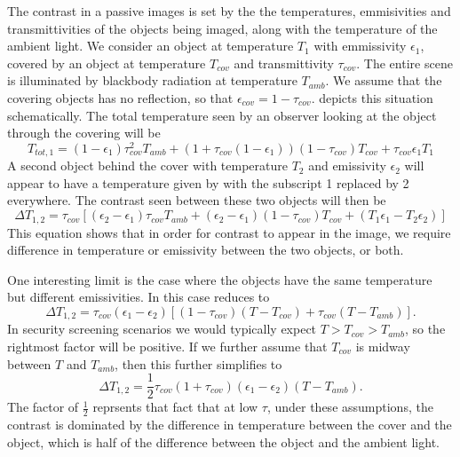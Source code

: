 The contrast in a passive images is set by the the temperatures, emmisivities and transmittivities of the objects being imaged, along with the temperature of the ambient light.
We consider an object at temperature $T_{1}$ with emmissivity $\epsilon_1$, covered by an object at temperature $T_{cov}$ and transmittivity $\tau_{cov}$.
The entire scene is illuminated by blackbody radiation at temperature $T_{amb}$.
We assume that the covering objects has no reflection, so that $\epsilon_{cov} = 1 - \tau_{cov}$.
 depicts this situation schematically. The total temperature seen by an observer looking at the object through the covering will be
\begin{equation} \label{eqn:ch1-t-tot}
  T_{tot,1} = (1 - \epsilon_{1}) \tau_{cov}^2 T_{amb} + 
           (1 + \tau_{cov}(1 - \epsilon_{1}))(1-\tau_{cov}) T_{cov} + 
           \tau_{cov} \epsilon_{1} T_1
\end{equation}
A second object behind the cover with temperature $T_2$ and emissivity $\epsilon_2$ will appear to have a temperature given by  with the subscript 1 replaced by 2 everywhere.
The contrast seen between these two objects will then be
\begin{equation} \label{eqn:ch1-delta-t}
  \Delta T_{1,2} = \tau_{cov} \left[ (\epsilon_2 - \epsilon_1) \tau_{cov} T_{amb} + 
                                    (\epsilon_2 - \epsilon_1) (1-\tau_{cov}) T_{cov} + 
                                    (T_1 \epsilon_1 - T_2 \epsilon_2) \right]
\end{equation}
This equation shows that in order for contrast to appear in the image, we require difference in temperature or emissivity between the two objects, or both.

One interesting limit is the case where the objects have the same temperature but different emissivities.
In this case  reduces to
\begin{equation}
  \Delta T_{1,2} = \tau_{cov} (\epsilon_1 - \epsilon_2) \left[ (1 - \tau_{cov}) (T - T_{cov}) + \tau_{cov} (T - T_{amb}) \right].
\end{equation}
In security screening scenarios we would typically expect $T > T_{cov} > T_{amb}$, so the rightmost factor will be positive.
If we further assume that $T_{cov}$ is midway between $T$ and $T_{amb}$, then this further simplifies to
\begin{equation}
  \Delta T_{1,2} = \frac{1}{2}\tau_{cov}(1+\tau_{cov}) (\epsilon_1 - \epsilon_2) (T - T_{amb}).
\end{equation}
The factor of $\frac{1}{2}$ reprsents that fact that at low $\tau$, under these assumptions, the contrast is dominated by the difference in temperature between the cover and the object, which is half of the difference between the object and the ambient light.

